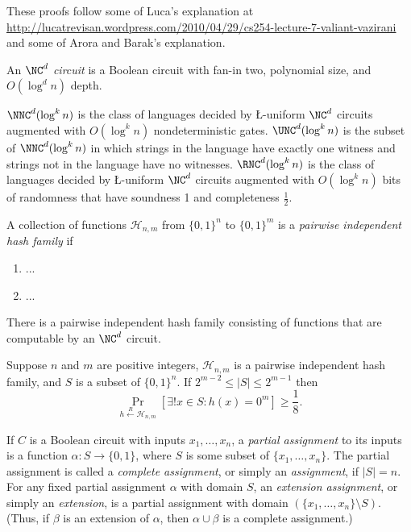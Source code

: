 \documentclass{article}
\newcommand{\existsu}{\exists !}
\newcommand{\random}{\overset{R}{\gets}}
\begin{document}
These proofs follow some of Luca's explanation at \url{http://lucatrevisan.wordpress.com/2010/04/29/cs254-lecture-7-valiant-vazirani} and some of Arora and Barak's explanation.

\begin{definition}
  An \emph{$\NC^d$ circuit} is a Boolean circuit with fan-in two, polynomial size, and $O(\log^d n)$ depth.
\end{definition}

\begin{definition}
  $\NNC^d(\log^k n)$ is the class of languages decided by \L-uniform $\NC^d$ circuits augmented with $O(\log^k n)$ nondeterministic gates.
  $\UNC^d(\log^k n)$ is the subset of $\NNC^d(\log^k n)$ in which strings in the language have exactly one witness and strings not in the language have no witnesses.
  $\RNC^d(\log^k n)$ is the class of languages decided by \L-uniform $\NC^d$ circuits augmented with $O(\log^k n)$ bits of randomness that have soundness 1 and completeness $\frac{1}{2}$.
\end{definition}

\begin{definition}
  A collection of functions $\mathcal{H}_{n, m}$ from $\{0, 1\}^n$ to $\{0, 1\}^m$ is a \emph{pairwise independent hash family} if
  \begin{enumerate}
  \item ...
  \item ...
  \end{enumerate}
\end{definition}

\begin{lemma}\label{lem:hash}
  There is a pairwise independent hash family consisting of functions that are computable by an $\NC^d$ circuit.
\end{lemma}

\begin{lemma}\label{lem:vv}
  Suppose $n$ and $m$ are positive integers, $\mathcal{H}_{n, m}$ is a pairwise independent hash family, and $S$ is a subset of $\{0, 1\}^n$.
  If $2^{m - 2} \leq |S| \leq 2^{m - 1}$ then
  \begin{equation*}
    \Pr_{h \random \mathcal{H}_{n, m}}\left[\existsu x \in S \colon h(x) = 0^m \right] \geq \frac{1}{8}.
  \end{equation*}
\end{lemma}

\begin{definition}
  If $C$ is a Boolean circuit with inputs $x_1, \dotsc, x_n$, a \emph{partial assignment} to its inputs is a function $\alpha \colon S \to \{0, 1\}$, where $S$ is some subset of $\{x_1, \dotsc, x_n\}$.
  The partial assignment is called a \emph{complete assignment}, or simply an \emph{assignment}, if $|S| = n$.
  For any fixed partial assignment $\alpha$ with domain $S$, an \emph{extension assignment}, or simply an \emph{extension}, is a partial assignment with domain $(\{x_1, \dotsc, x_n\} \setminus S)$.
  (Thus, if $\beta$ is an extension of $\alpha$, then $\alpha \cup \beta$ is a complete assignment.)
\end{definition}
\end{document}
